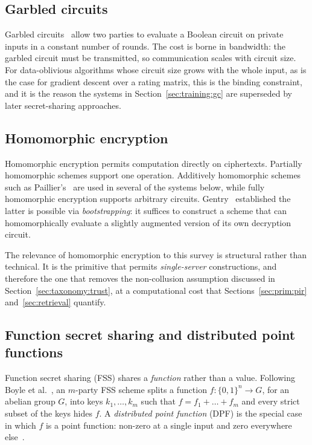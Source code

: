 \subsection{Garbled circuits}
\label{sec:prim:gc}

Garbled circuits~\cite{yao1986} allow two parties to evaluate a Boolean circuit on private inputs
in a constant number of rounds. The cost is borne in bandwidth: the garbled circuit must be
transmitted, so communication scales with circuit size. For data-oblivious algorithms whose
circuit size grows with the whole input, as is the case for gradient descent over a rating
matrix, this is the binding constraint, and it is the reason the systems in
Section~\ref{sec:training:gc} are superseded by later secret-sharing approaches.

\subsection{Homomorphic encryption}
\label{sec:prim:he}

Homomorphic encryption permits computation directly on ciphertexts. Partially homomorphic schemes
support one operation. Additively homomorphic schemes such as Paillier's~\cite{paillier1999}
are used in several of the systems below, while fully homomorphic encryption supports
arbitrary circuits. Gentry~\cite{gentry2009} established the latter is possible via
\emph{bootstrapping}: it suffices to construct a scheme that can homomorphically evaluate a
slightly augmented version of its own decryption circuit.

The relevance of homomorphic encryption to this survey is structural rather than technical. It is
the primitive that permits \emph{single-server} constructions, and therefore the one that removes
the non-collusion assumption discussed in Section~\ref{sec:taxonomy:trust}, at a computational
cost that Sections~\ref{sec:prim:pir} and~\ref{sec:retrieval} quantify.

\subsection{Function secret sharing and distributed point functions}
\label{sec:prim:fss}

Function secret sharing (FSS) shares a \emph{function} rather than a value. Following Boyle et
al.~\cite{bgi2016}, an $m$-party FSS scheme splits a function $f\colon \{0,1\}^n \to G$, for an
abelian group $G$, into keys $k_1, \dots, k_m$ such that $f = f_1 + \dots + f_m$ and every strict
subset of the keys hides $f$. A \emph{distributed point function} (DPF) is the special case in
which $f$ is a point function: non-zero at a single input and zero everywhere
else~\cite{gilboa2014}.

